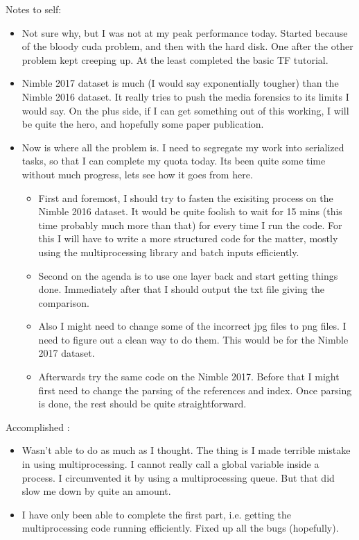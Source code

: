 \documentclass{article}
\begin{document}
Notes to self:
\begin{itemize}
\item Not sure why, but I was not at my peak performance today. Started because of the bloody cuda problem, and then with the hard disk. One after the other problem kept creeping up. At the least completed the basic TF tutorial.
\item Nimble 2017 dataset is much (I would say exponentially tougher) than the Nimble 2016 dataset. It really tries to push the media forensics to its limits I would say. On the plus side, if I can get something out of this working, I will be quite the hero, and hopefully some paper publication.
\item Now is where all the problem is. I need to segregate my work into serialized tasks, so that I can complete my quota today. Its been quite some time without much progress, lets see how it goes from here.
  \begin{itemize}
  \item First and foremost, I should try to fasten the exisiting process on the Nimble 2016 dataset. It would be quite foolish to wait for 15 mins (this time probably much more than that) for every time I run the code. For this I will have to write a more structured code for the matter, mostly using the multiprocessing library and batch inputs efficiently.
  \item Second on the agenda is to use one layer back and start getting things done. Immediately after that I should output the txt file giving the comparison.
  \item Also I might need to change some of the incorrect jpg files to png files. I need to figure out a clean way to do them. This would be for the Nimble 2017 dataset.
  \item Afterwards try the same code on the Nimble 2017. Before that I might first need to change the parsing of the references and index. Once parsing is done, the rest should be quite straightforward.
  \end{itemize}
\end{itemize}

Accomplished :
\begin{itemize}
\item Wasn't able to do as much as I thought. The thing is I made terrible mistake in using multiprocessing. I cannot really call a global variable inside a process. I circumvented it by using a multiprocessing queue. But that did slow me down by quite an amount.
\item I have only been able to complete the first part, i.e. getting the multiprocessing code running efficiently. Fixed up all the bugs (hopefully).
\end{itemize}
\end{document}
